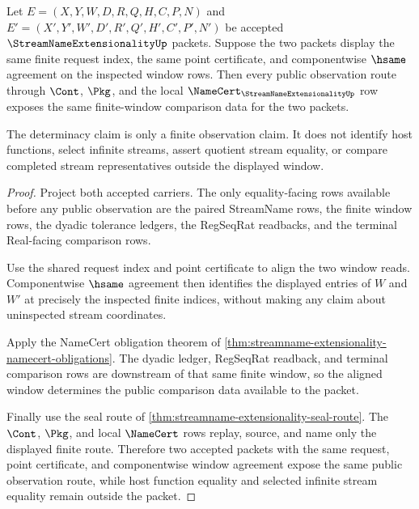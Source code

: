 \begin{theorem}
\label{thm:streamname-extensionality-window-determinacy}
Let $E=(X,Y,W,D,R,Q,H,C,P,N)$ and $E'=(X',Y',W',D',R',Q',H',C',P',N')$ be accepted $\StreamNameExtensionalityUp$ packets. Suppose the two packets display the same finite request index, the same point certificate, and componentwise $\hsame$ agreement on the inspected window rows. Then every public observation route through $\Cont$, $\Pkg$, and the local $\NameCert_{\StreamNameExtensionalityUp}$ row exposes the same finite-window comparison data for the two packets.

The determinacy claim is only a finite observation claim. It does not identify host functions, select infinite streams, assert quotient stream equality, or compare completed stream representatives outside the displayed window.
\end{theorem}
\begin{proof}
Project both accepted carriers. The only equality-facing rows available before any public observation are the paired StreamName rows, the finite window rows, the dyadic tolerance ledgers, the RegSeqRat readbacks, and the terminal Real-facing comparison rows.

Use the shared request index and point certificate to align the two window reads. Componentwise $\hsame$ agreement then identifies the displayed entries of $W$ and $W'$ at precisely the inspected finite indices, without making any claim about uninspected stream coordinates.

Apply the NameCert obligation theorem of \autoref{thm:streamname-extensionality-namecert-obligations}. The dyadic ledger, RegSeqRat readback, and terminal comparison rows are downstream of that same finite window, so the aligned window determines the public comparison data available to the packet.

Finally use the seal route of \autoref{thm:streamname-extensionality-seal-route}. The $\Cont$, $\Pkg$, and local $\NameCert$ rows replay, source, and name only the displayed finite route. Therefore two accepted packets with the same request, point certificate, and componentwise window agreement expose the same public observation route, while host function equality and selected infinite stream equality remain outside the packet.
\end{proof}

